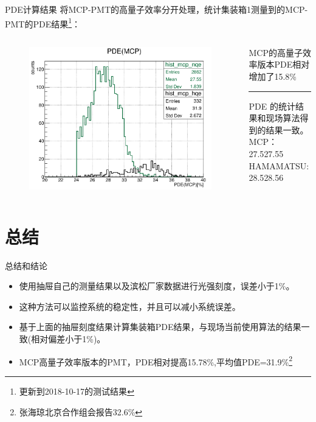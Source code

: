 \documentclass[11pt,compress,xcolor=x11names,UTF8]{beamer}
\begin{document}
\begin{frame}{PDE计算结果}
将MCP-PMT的高量子效率分开处理，统计集装箱1测量到的MCP-PMT的PDE结果\footnote{更新到2018-10-17的测试结果}：
\begin{columns}
\begin{column}{.56\textwidth}
\begin{figure}
\centering
\includegraphics[width=\textwidth]{mcppde}
\end{figure}
\end{column}
\begin{column}{.4\textwidth}
\alert{MCP的高量子效率版本PDE相对增加了15.8\%}
\vspace{.5cm}
\hrule{\textwidth}
\vspace{.5cm}
PDE 的统计结果和现场算法得到的结果一致。\\
MCP：27.5\leftrightarrow \alert{27.55}\\
HAMAMATSU:28.5\leftrightarrow \alert{28.56}
\end{column}
\end{columns}
\end{frame}
\section{总结}

\begin{frame}{总结和结论}
\begin{itemize}
\item 使用抽屉自己的测量结果以及滨松厂家数据进行光强刻度，误差小于1\%。
\item 这种方法可以监控系统的稳定性，并且可以减小系统误差。
\item 基于上面的抽屉刻度结果计算集装箱PDE结果，与现场当前使用算法的结果一致(相对偏差小于1\%)。
\item MCP高量子效率版本的PMT，PDE相对提高15.78\%,平均值PDE=31.9\%\footnote{张海琼北京合作组会报告32.6\%}
\end{itemize}
\end{frame}
\end{document}
